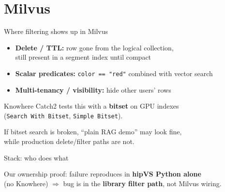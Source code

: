 \documentclass[aspectratio=169,11pt]{beamer}
\begin{document}
\section{Milvus}
\begin{frame}{Where filtering shows up in Milvus}
  \begin{itemize}
    \item \textbf{Delete / TTL:} row gone from the logical collection,\\
          still present in a segment index until compact
    \item \textbf{Scalar predicates:} \texttt{color == "red"} combined with vector search
    \item \textbf{Multi-tenancy / visibility:} hide other users' rows
  \end{itemize}

  \vspace{0.7em}
  Knowhere Catch2 tests this with a \textbf{bitset} on GPU indexes\\
  (\texttt{Search With Bitset}, \texttt{Simple Bitset}).

  \vspace{0.5em}
  {\footnotesize If bitset search is broken, ``plain RAG demo'' may look fine,\\
  while production delete/filter paths are not.}
\end{frame}

\begin{frame}{Stack: who does what}
  \begin{center}
  \end{center}

  \vspace{0.5em}
  Our ownership proof: failure reproduces in \textbf{hipVS Python alone}\\
  (no Knowhere) $\Rightarrow$ bug is in the \textbf{library filter path}, not Milvus wiring.
\end{frame}
\end{document}
